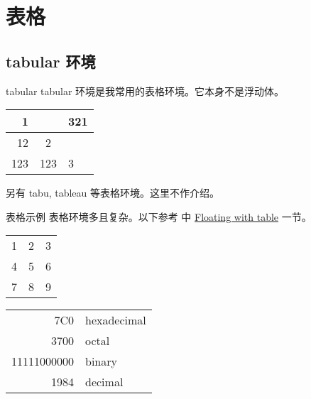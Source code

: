 \documentclass[final]{ctexbeamer}
\begin{document}
\section{表格}
% 
\subsection{tabular 环境}
\begin{frame}[fragile]{tabular}
tabular 环境是我常用的表格环境。它本身不是浮动体。
\begin{sidelst}
\begin{tabular}{|r|c|l|}
\cline{1-1} \cline{3-3}
1 & & 321 \\ \hline
12 & 2 \\[.5cm] \hline
123 & 123 & 3 \\ \hline
\end{tabular}
\end{sidelst}
另有 tabu, tableau 等表格环境。这里不作介绍。
\end{frame}


\begin{frame}[fragile]{表格示例}
表格环境多且复杂。以下参考 \cite{wiki:tables} 中 \href{https://en.wikibooks.org/wiki/LaTeX/Tables\#Floating\_with\_table}{Floating with table} 一节。
\begin{sidelst}
\centering     %
\begin{tabular}{r | l c}  %
1 & 2 & 3 \\              %
4 & 5 & 6 \\
7 & 8 & 9 \\ \hline       %
\end{tabular}
\end{sidelst}
\end{frame}


\begin{frame}[fragile]
\begin{sidelst}
\begin{tabular}{|r|l|}    %
\hline
7C0 & hexadecimal \\
3700 & octal \\ \cline{2-2} %
11111000000 & binary \\
\hline \hline
1984 & decimal \\ \hline
\end{tabular}
\end{sidelst}
\end{frame}
\end{document}
